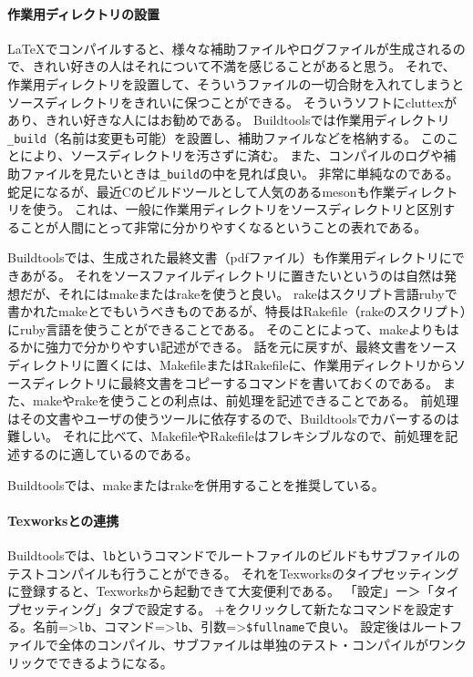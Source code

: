 \hypertarget{ux4f5cux696dux7528ux30c7ux30a3ux30ecux30afux30c8ux30eaux306eux8a2dux7f6e}{%
\paragraph{作業用ディレクトリの設置}\label{ux4f5cux696dux7528ux30c7ux30a3ux30ecux30afux30c8ux30eaux306eux8a2dux7f6e}}

LaTeXでコンパイルすると、様々な補助ファイルやログファイルが生成されるので、きれい好きの人はそれについて不満を感じることがあると思う。
それで、作業用ディレクトリを設置して、そういうファイルの一切合財を入れてしまうとソースディレクトリをきれいに保つことができる。
そういうソフトにcluttexがあり、きれい好きな人にはお勧めである。
Buildtoolsでは作業用ディレクトリ\texttt{\_build}（名前は変更も可能）を設置し、補助ファイルなどを格納する。
このことにより、ソースディレクトリを汚さずに済む。
また、コンパイルのログや補助ファイルを見たいときは\texttt{\_build}の中を見れば良い。
非常に単純なのである。
蛇足になるが、最近Cのビルドツールとして人気のあるmesonも作業ディレクトリを使う。
これは、一般に作業用ディレクトリをソースディレクトリと区別することが人間にとって非常に分かりやすくなるということの表れである。

Buildtoolsでは、生成された最終文書（pdfファイル）も作業用ディレクトリにできあがる。
それをソースファイルディレクトリに置きたいというのは自然は発想だが、それにはmakeまたはrakeを使うと良い。
rakeはスクリプト言語rubyで書かれたmakeとでもいうべきものであるが、特長はRakefile（rakeのスクリプト）にruby言語を使うことができることである。
そのことによって、makeよりもはるかに強力で分かりやすい記述ができる。
話を元に戻すが、最終文書をソースディレクトリに置くには、MakefileまたはRakefileに、作業用ディレクトリからソースディレクトリに最終文書をコピーするコマンドを書いておくのである。
また、makeやrakeを使うことの利点は、前処理を記述できることである。
前処理はその文書やユーザの使うツールに依存するので、Buildtoolsでカバーするのは難しい。
それに比べて、MakefileやRakefileはフレキシブルなので、前処理を記述するのに適しているのである。

Buildtoolsでは、makeまたはrakeを併用することを推奨している。

\hypertarget{texworksux3068ux306eux9023ux643a}{%
\paragraph{Texworksとの連携}\label{texworksux3068ux306eux9023ux643a}}

Buildtoolsでは、\texttt{lb}というコマンドでルートファイルのビルドもサブファイルのテストコンパイルも行うことができる。
それをTexworksのタイプセッティングに登録すると、Texworksから起動できて大変便利である。
「設定」ー＞「タイプセッティング」タブで設定する。
+をクリックして新たなコマンドを設定する。名前=\textgreater{}\texttt{lb}、コマンド=\textgreater{}\texttt{lb}、引数=\textgreater{}\texttt{\$fullname}で良い。
設定後はルートファイルで全体のコンパイル、サブファイルは単独のテスト・コンパイルがワンクリックでできるようになる。


